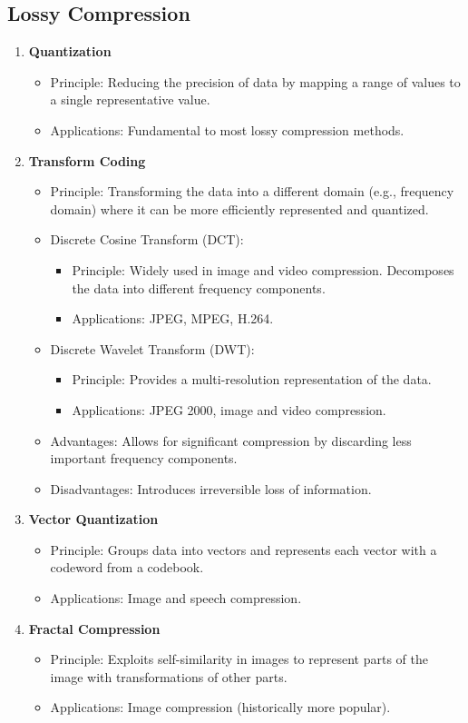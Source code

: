 \subsection{Lossy Compression}
\begin{enumerate}[label=\textbf{\Alph*.}]
    \item \textbf{Quantization} \begin{itemize}
        \item Principle: Reducing the precision of data by mapping a range of values to a single representative value.
        \item Applications: Fundamental to most lossy compression methods.
    \end{itemize}
    \item \textbf{Transform Coding} \begin{itemize}
        \item Principle: Transforming the data into a different domain (e.g., frequency domain) where it can be more efficiently represented and quantized.
        \item Discrete Cosine Transform (DCT): \begin{itemize}
            \item Principle: Widely used in image and video compression. Decomposes the data into different frequency components.
            \item Applications: JPEG, MPEG, H.264.
        \end{itemize}
        \item Discrete Wavelet Transform (DWT): \begin{itemize}
            \item Principle: Provides a multi-resolution representation of the data.
            \item Applications: JPEG 2000, image and video compression.
        \end{itemize}
        \item Advantages: Allows for significant compression by discarding less important frequency components.
        \item Disadvantages: Introduces irreversible loss of information.
    \end{itemize}
    \item \textbf{Vector Quantization} \begin{itemize}
        \item Principle: Groups data into vectors and represents each vector with a codeword from a codebook.
        \item Applications: Image and speech compression.
    \end{itemize}
    \item \textbf{Fractal Compression}\begin{itemize}
        \item Principle: Exploits self-similarity in images to represent parts of the image with transformations of other parts.
        \item Applications: Image compression (historically more popular).
    \end{itemize}
\end{enumerate}
